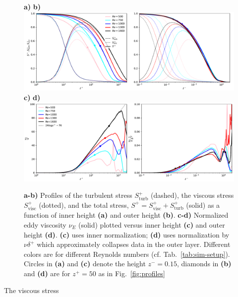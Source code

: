 \documentclass[smallcondensed,final]{svjour3}
\begin{document}
\begin{figure}
  \textbf{a)}\hspace{0.47\textwidth} \textbf{b)}\\
  \includegraphics[width=\textwidth]{../plot/stresses.pdf}
  \textbf{c)}\hspace{0.47\textwidth} \textbf{d)}\\    
  \includegraphics[width=\textwidth]{../plot/eddy_viscosity.pdf}\\
  \caption{
    \textbf{a-b)} Profiles of
    the turbulent stress $S_\mathrm{turb}^+$ (dashed), 
    the viscous stress  $S_\mathrm{visc}^+$ (dotted), 
    and the total stress, $S^+=S_\mathrm{visc}^++S_\mathrm{turb}^+$ (solid)
    as a function of inner height \textbf{(a)} and outer height \textbf{(b)}. 
    \textbf{c-d)} Normalized eddy viscosity $\nu_E$ (solid) plotted versus
    inner height \textbf{(c)} and outer height \textbf{(d)}. \textbf{(c)} uses inner normalization; 
    \textbf{(d)} uses normalization by $\nu \delta^+$ which approximately collapses data in the 
    outer layer. 
    Different colors are for different Reynolds numbers (cf. Tab.~\ref{tab:sim-setup}).
    Circles in \textbf{(a)} and \textbf{(c)} denote the height
    $z^-=0.15$, diamonds in \textbf{(b)} and \textbf{(d)} are for $z^+=50$
    as in Fig.~\ref{fig:profiles}
    \label{fig:stresses}} 
\end{figure} 
The viscous stress
%
\end{document}
